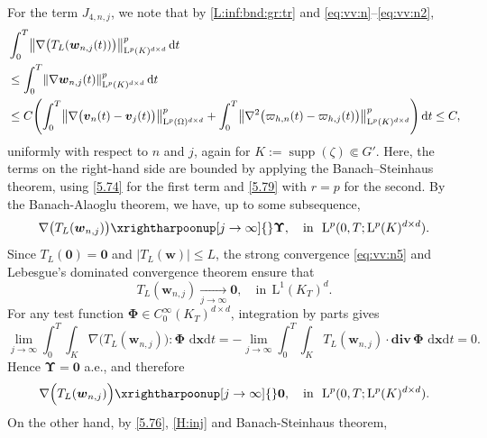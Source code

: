 \documentclass[12pt,reqno]{amsart}
\numberwithin{equation}{section}
\let\originalleft\left
\let\originalright\right
\renewcommand{\left}{\mathopen{}\mathclose\bgroup\originalleft}
\renewcommand{\right}{\aftergroup\egroup\originalright}
\theoremstyle{definition}
\def\dt{\,\mathrm{d}t}
\def\dxt{\,\mathrm{d}\boldsymbol{x}\mathrm{d}t}
\def\divv{\mathbf{div}\,}
\def\supp{\operatorname{supp}}
\def\L{\mathrm{L}}
\def\vv{\boldsymbol{v}}
\def\w{\boldsymbol{w}}
\begin{document}
{{{For the term $J_{4,n,j}$, we note that by \eqref{L:inf:bnd:gr:tr} and \eqref{eq:vv:n}--\eqref{eq:vv:n2},
\begin{equation*}
\begin{split}
&
\int_0^T\left\|\nabla\big(T_L(\w_{n,j}(t))\big) \right\|_{\L^{p}(K)^{d\times d}}^p \dt \\&\leq
\int_0^T\left\|\nabla\w_{n,j}(t)\right\|_{\L^{p}(K)^{d\times d}}^p \dt  \\
&\leq
C\left(\int_0^T\left\|\nabla\big(\vv_{n}(t)-\vv_{j}(t)\big)\right\|_{\L^{p}(\Omega)^{d\times d}}^p +
\int_0^T\left\|\nabla^2\big(\varpi_{h,n}(t)-\varpi_{h,j}(t)\big)\right\|_{\L^{p}(K)^{d\times d}}^p\right) \dt \leq C,
\end{split}
\end{equation*}
uniformly with respect to $n$ and $j$, again for $K:=\supp(\zeta)\Subset G'$.
Here, the terms on the right-hand side are bounded by applying the Banach–Steinhaus theorem, using \eqref{5.74} for the first term and \eqref{5.79} with $r = p$ for the second.
By the Banach-Alaoglu theorem, we have, up to some subsequence,
\begin{equation*}
\nabla\big(T_L(\w_{n,j})\big) \xrightharpoonup[j\to\infty]{} \boldsymbol{\Upsilon}, \quad \text{in}\ \ \L^{p}(0,T; \L^{p}(K)^{d\times d}).
\end{equation*}
Since $T_L(\mathbf{0})=\mathbf{0}$ and $|T_L(\w )| \leq L$, the strong convergence \eqref{eq:vv:n5} and Lebesgue's dominated convergence theorem ensure that
\begin{equation*}
T_L(\w_{n,j}) \xrightarrow[j\to\infty]{} \mathbf{0}, \quad \text{in}\ \ \L^1(K_T)^d.
\end{equation*}
For any test function $\boldsymbol{\Phi} \in C_0^\infty(K_T)^{d\times d}$, integration by parts gives
\begin{equation*}
\lim_{j\to\infty} \int_0^T\!\!\int_{K} \nabla\big( T_L(\w_{n,j})\big) : \boldsymbol{\Phi} \,\dxt =
-\lim_{j\to\infty} \int_0^T\!\!\int_{K} T_L(\w_{n,j}) \cdot \divv\boldsymbol{\Phi} \,\dxt = 0.
\end{equation*}
Hence $\boldsymbol{\Upsilon} = \mathbf{0}$ a.e., and therefore
\begin{equation*}%
\nabla \Big( T_L(\w_{n,j}) \Big) \xrightharpoonup[j\to\infty]{} \mathbf{0}, \quad\text{in}\ \ \L^{p}(0,T; \L^{p}(K)^{d\times d}).
\end{equation*}
On the other hand, by \eqref{5.76}, \eqref{H:inj} and Banach-Steinhaus theorem,
\begin{equation*}

\end{equation*}}}}
\end{document}
